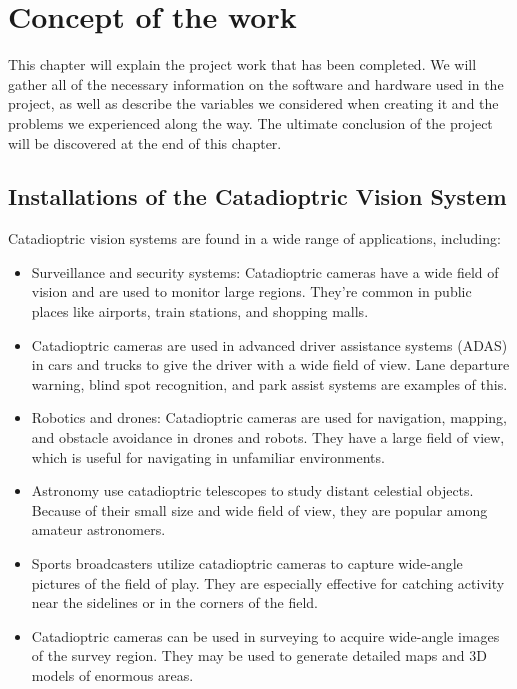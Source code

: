 \documentclass[11pt, a4paper, openany]{book}
\begin{document}



\chapter{Concept of the work}
This chapter will explain the project work that has been completed. We will gather all of the necessary information on the software and hardware used in the project, as well as describe the variables we considered when creating it and the problems we experienced along the way. The ultimate conclusion of the project will be discovered at the end of this chapter.

\section{Installations of the Catadioptric Vision System} \label{selection}
Catadioptric vision systems are found in a wide range of applications, including:
\begin{itemize}
\item Surveillance and security systems: Catadioptric cameras have a wide field of vision and are used to monitor large regions. They're common in public places like airports, train stations, and shopping malls.
\item Catadioptric cameras are used in advanced driver assistance systems (ADAS) in cars and trucks to give the driver with a wide field of view. Lane departure warning, blind spot recognition, and park assist systems are examples of this.
\item Robotics and drones: Catadioptric cameras are used for navigation, mapping, and obstacle avoidance in drones and robots. They have a large field of view, which is useful for navigating in unfamiliar environments.
\item Astronomy use catadioptric telescopes to study distant celestial objects. Because of their small size and wide field of view, they are popular among amateur astronomers.
\item Sports broadcasters utilize catadioptric cameras to capture wide-angle pictures of the field of play. They are especially effective for catching activity near the sidelines or in the corners of the field.
\item Catadioptric cameras can be used in surveying to acquire wide-angle images of the survey region. They may be used to generate detailed maps and 3D models of enormous areas.\cite{zhang2012automatic}
\end{itemize}
\end{document}
